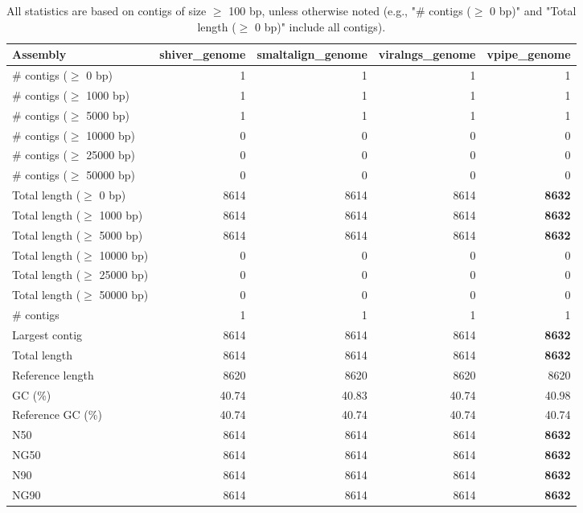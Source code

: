 \documentclass[12pt,a4paper]{article}
\begin{document}
\begin{table}[ht]
\begin{center}
\caption{All statistics are based on contigs of size $\geq$ 100 bp, unless otherwise noted (e.g., "\# contigs ($\geq$ 0 bp)" and "Total length ($\geq$ 0 bp)" include all contigs).}
\begin{tabular}{|l*{4}{|r}|}
\hline
Assembly & shiver\_genome & smaltalign\_genome & viralngs\_genome & vpipe\_genome \\ \hline
\# contigs ($\geq$ 0 bp) & 1 & 1 & 1 & 1 \\ \hline
\# contigs ($\geq$ 1000 bp) & 1 & 1 & 1 & 1 \\ \hline
\# contigs ($\geq$ 5000 bp) & 1 & 1 & 1 & 1 \\ \hline
\# contigs ($\geq$ 10000 bp) & 0 & 0 & 0 & 0 \\ \hline
\# contigs ($\geq$ 25000 bp) & 0 & 0 & 0 & 0 \\ \hline
\# contigs ($\geq$ 50000 bp) & 0 & 0 & 0 & 0 \\ \hline
Total length ($\geq$ 0 bp) & 8614 & 8614 & 8614 & {\bf 8632} \\ \hline
Total length ($\geq$ 1000 bp) & 8614 & 8614 & 8614 & {\bf 8632} \\ \hline
Total length ($\geq$ 5000 bp) & 8614 & 8614 & 8614 & {\bf 8632} \\ \hline
Total length ($\geq$ 10000 bp) & 0 & 0 & 0 & 0 \\ \hline
Total length ($\geq$ 25000 bp) & 0 & 0 & 0 & 0 \\ \hline
Total length ($\geq$ 50000 bp) & 0 & 0 & 0 & 0 \\ \hline
\# contigs & 1 & 1 & 1 & 1 \\ \hline
Largest contig & 8614 & 8614 & 8614 & {\bf 8632} \\ \hline
Total length & 8614 & 8614 & 8614 & {\bf 8632} \\ \hline
Reference length & 8620 & 8620 & 8620 & 8620 \\ \hline
GC (\%) & 40.74 & 40.83 & 40.74 & 40.98 \\ \hline
Reference GC (\%) & 40.74 & 40.74 & 40.74 & 40.74 \\ \hline
N50 & 8614 & 8614 & 8614 & {\bf 8632} \\ \hline
NG50 & 8614 & 8614 & 8614 & {\bf 8632} \\ \hline
N90 & 8614 & 8614 & 8614 & {\bf 8632} \\ \hline
NG90 & 8614 & 8614 & 8614 & {\bf 8632} \\ \hline

\end{tabular}
\end{center}
\end{table}
\end{document}
